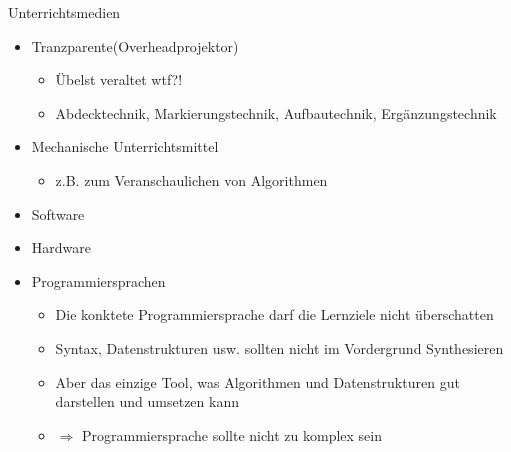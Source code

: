 \documentclass{article}
\begin{document}
\begin{block}{Unterrichtsmedien}
\begin{itemize}
\begin{itemize}
        \end{itemize}
        \item Tranzparente(Overheadprojektor)
        \begin{itemize}
            \item Übelst veraltet wtf?!
            \item Abdecktechnik, Markierungstechnik, Aufbautechnik, Ergänzungstechnik
        \end{itemize}
        \item Mechanische Unterrichtsmittel
        \begin{itemize}
            \item z.B. zum Veranschaulichen von Algorithmen
        \end{itemize}
        \item Software
        \item Hardware
        \item Programmiersprachen
        \begin{itemize}
            \item Die konktete Programmiersprache darf die Lernziele nicht überschatten
            \item Syntax, Datenstrukturen usw. sollten nicht im Vordergrund Synthesieren
            \item Aber das einzige Tool, was Algorithmen und Datenstrukturen gut darstellen und umsetzen kann
            \item $\Rightarrow$ Programmiersprache sollte nicht zu komplex sein
        \end{itemize}
    \end{itemize}
\end{block}
\end{document}
